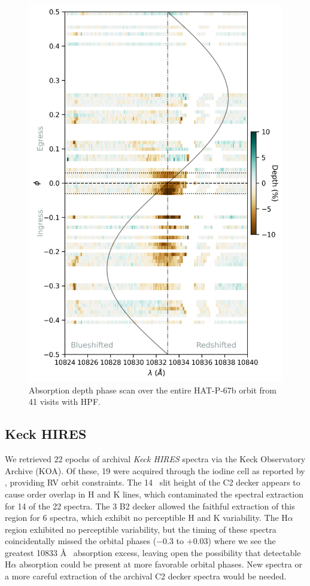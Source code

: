 \documentclass[twocolumn]{aastex631}
\begin{document}
\begin{figure}
    \includegraphics[width=\linewidth]{figures/phase_2D_diagram_resid.png}
    \caption{Absorption depth phase scan over the entire HAT-P-67b orbit from 41 visits with HPF.  }
    \label{fig:HPFscanResid}
\end{figure}



\subsection{Keck HIRES}
We retrieved 22 epochs of archival \emph{Keck HIRES} spectra via the Keck Observatory Archive (KOA). Of these, 19 were acquired through the iodine cell as reported by \citet{2017AJ....153..211Z}, providing RV orbit constraints.  The 14\arcsec~ slit height of the C2 decker appears to cause order overlap in  H and K lines, which contaminated the spectral extraction for 14 of the 22 spectra.  The 3 B2 decker allowed the faithful extraction of this region for 6 spectra, which exhibit no perceptible  H and K variability.  The H$\alpha$ region exhibited no perceptible variability, but the timing of these spectra coincidentally missed the orbital phases ($-0.3$ to $+0.03$) where we see the greatest  10833 \AA~ absorption excess, leaving open the possibility that detectable H$\alpha$ absorption could be present at more favorable orbital phases.  New spectra or a more careful extraction of the archival C2 decker spectra would be needed.
\end{document}
